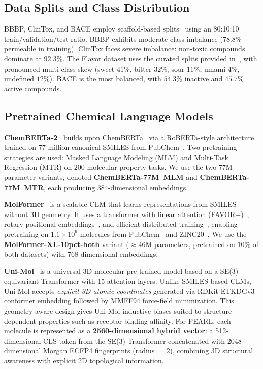 \documentclass[9pt,twocolumn,conference]{IEEEtran}
\begin{document}
\subsection{Data Splits and Class Distribution}
BBBP, ClinTox, and BACE employ scaffold-based splits~\cite{ramsundar2019deep} using an 80:10:10 train/validation/test ratio. BBBP exhibits moderate class imbalance (78.8\% permeable in training). ClinTox faces severe imbalance: non-toxic compounds dominate at $92.3\%$. The Flavor dataset uses the curated splits provided in~\cite{zimmermann2024fart}, with pronounced multi-class skew (sweet $41\%$, bitter $32\%$, sour $11\%$, umami $4\%$, undefined $12\%$). BACE is the most balanced, with $54.3\%$ inactive and $45.7\%$ active compounds.

\subsection{Pretrained Chemical Language Models}
\textbf{ChemBERTa-2}~\cite{ahmad2022chemberta2} builds upon ChemBERTa~\cite{chithrananda2020chemberta} via a RoBERTa-style architecture trained on $77$ million canonical SMILES from PubChem~\cite{kim2023pubchem}. Two pretraining strategies are used: Masked Language Modeling (MLM) and Multi-Task Regression (MTR) on $200$ molecular
property tasks. We use the two 77M-parameter variants, denoted \textbf{ChemBERTa-77M~MLM} and \textbf{ChemBERTa-77M~MTR}, each producing 384-dimensional embeddings.

\textbf{MolFormer}~\cite{ross2022molformer} is a scalable CLM that learns representations from SMILES without 3D geometry. It uses a transformer with linear attention (FAVOR+)~\cite{choromanski2021rethinking}, rotary positional embeddings~\cite{heo2024rotary}, and efficient distributed training~\cite{isard2009distributed}, enabling pretraining on $1.1\times 10^{9}$  molecules from PubChem~\cite{kim2023pubchem} and ZINC20~\cite{irwin2020zinc20}. We use the \textbf{MolFormer-XL-10pct-both} variant ($\approx 46$M parameters, pretrained on $10\%$ of both datasets) with 768-dimensional embeddings.

\textbf{Uni-Mol}~\cite{zhou2023unimol} is a universal 3D molecular pre-trained model based on a SE(3)-equivariant Transformer with 15 attention layers. Unlike SMILES-based CLMs, Uni-Mol accepts \emph{explicit 3D atomic coordinates} generated via RDKit ETKDGv3 conformer embedding followed by MMFF94 force-field minimization.
This geometry-aware design gives Uni-Mol inductive biases suited to structure-dependent properties such as receptor binding affinity. For PEARL, each molecule is represented as a \textbf{2560-dimensional hybrid vector}: a 512-dimensional CLS token from the SE(3)-Transformer concatenated with 2048-dimensional Morgan ECFP4 fingerprints (radius $= 2$), combining 3D structural awareness with explicit 2D topological information.
\end{document}
